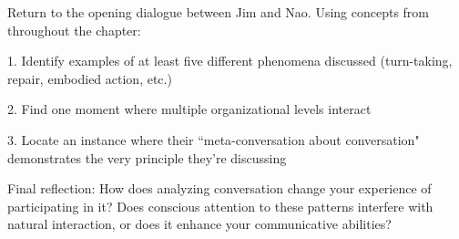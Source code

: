 \begin{tcolorbox}[title=Exercise: Synthesis—Conversation as System, colback=white, colframe=black!75!black, fonttitle=\bfseries]
Return to the opening dialogue between Jim and Nao. Using concepts from throughout the chapter:

1. Identify examples of at least five different phenomena discussed (turn-taking, repair, embodied action, etc.)

2. Find one moment where multiple organizational levels interact

3. Locate an instance where their ``meta-conversation about conversation" demonstrates the very principle they're discussing

Final reflection: How does analyzing conversation change your experience of participating in it? Does conscious attention to these patterns interfere with natural interaction, or does it enhance your communicative abilities?
\end{tcolorbox}

